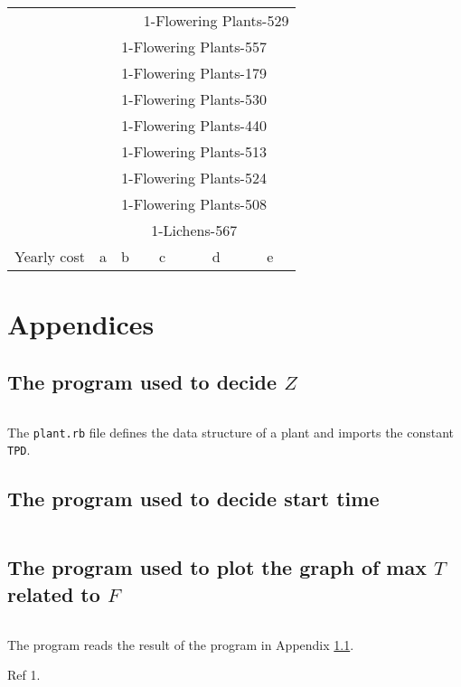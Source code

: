 \documentclass{article}
\begin{document}
\begin{table}
\begin{tabular}{c||c|c|c|c|c}
& & & \multicolumn{3}{c}{1-Flowering Plants-529}\\
& \multicolumn{5}{c}{1-Flowering Plants-557}\\
& \multicolumn{5}{c}{1-Flowering Plants-179}\\
& \multicolumn{5}{c}{1-Flowering Plants-530}\\
& \multicolumn{5}{c}{1-Flowering Plants-440}\\
& \multicolumn{5}{c}{1-Flowering Plants-513}\\
& \multicolumn{5}{c}{1-Flowering Plants-524}\\
& \multicolumn{5}{c}{1-Flowering Plants-508}\\
& \multicolumn{5}{c}{1-Lichens-567}\\
\hline
Yearly cost & a & b & c & d & e
\end{tabular}
\end{table}

\newpage

\section{Appendices}

\subsection{The program used to decide $Z$}
\label{appendix:prog min T}

\inputminted{ruby}{../knappack.rb}

The \texttt{plant.rb} file defines the data structure of a plant and imports the constant \texttt{TPD}.

\subsection{The program used to decide start time}

\inputminted{ruby}{../min_variance.rb}

\subsection{The program used to plot the graph of max $T$ related to $F$}

\inputminted{python}{../plot.py}

The program reads the result of the program in Appendix \ref{appendix:prog min T}.

\newpage

\begin{thebibliography}{9}
\item Ref 1.
\end{thebibliography}
\end{document}
